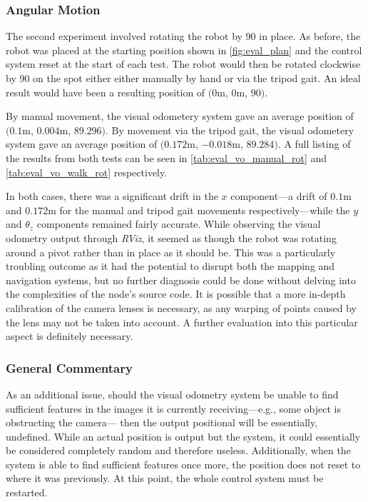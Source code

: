 \subsubsection{Angular Motion}

The second experiment involved rotating the robot by $90$\textdegree{} in place. As before, the robot was placed at the starting position shown in \autoref{fig:eval_plan} and the control system reset at the start of each test. The robot would then be rotated clockwise by 90\textdegree{} on the spot either either manually by hand or via the tripod gait. An ideal result would have been a resulting position of $(0$m, $0$m, $90$\textdegree{}$)$.

By manual movement, the visual odometery system gave an average position of $(0.1$m, $0.004$m, $89.296$\textdegree{}$)$. By movement via the tripod gait, the visual odometery system gave an average position of $(0.172$m, $-0.018$m, $89.284$\textdegree{}$)$. A full listing of the results from both tests can be seen in \autoref{tab:eval_vo_manual_rot} and \autoref{tab:eval_vo_walk_rot} respectively.

In both cases, there was a significant drift in the $x$ component---a drift of $0.1$m and $0.172$m for the manual and tripod gait movements respectively---while the $y$ and $\theta_z$ components remained fairly accurate. While observing the visual odometry output through \emph{RViz}, it seemed as though the robot was rotating around a pivot rather than in place as it should be. This was a particularly troubling outcome as it had the potential to disrupt both the mapping and navigation systems, but no further diagnosis could be done without delving into the complexities of the node's source code. It is possible that a more in-depth calibration of the camera lenses is necessary, as any warping of points caused by the lens may not be taken into account. A further evaluation into this particular aspect is definitely necessary.

\subsubsection{General Commentary}

As an additional issue, should the visual odometry system be unable to find sufficient features in the images it is currently receiving---e.g., some object is obstructing the camera--- then the output positional will be essentially, undefined. While an actual position is output but the system, it could essentially be considered completely random and therefore useless. Additionally, when the system is able to find sufficient features once more, the position does not reset to where it was previously. At this point, the whole control system must be restarted.

